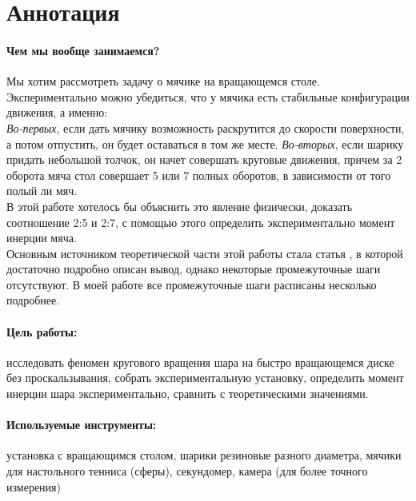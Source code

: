 \documentclass[a4paper,12pt]{article}
\begin{document}
	
	\newpage

	
	\section{Аннотация}
	
	\paragraph{Чем мы вообще занимаемся?}
	
	Мы хотим рассмотреть задачу о мячике на вращающемся столе. Экспериментально можно убедиться, что у мячика есть стабильные конфигурации движения, а именно:\\
	
	\textit{Во-первых}, если дать мячику возможность раскрутится до скорости поверхности, а потом отпустить, он будет оставаться в том же месте.
	\textit{Во-вторых}, если шарику придать небольшой толчок, он начет совершать круговые движения, причем за 2 оборота мяча стол совершает 5 или 7 полных оборотов, в зависимости от того полый ли мяч.\\
	
	В этой работе хотелось бы объяснить это явление физически, доказать соотношение 2:5 и 2:7, с помощью этого определить экспериментально момент инерции мяча.\\
	
	Основным источником теоретической части этой работы стала статья \cite{weltner}, в которой достаточно подробно описан вывод, однако некоторые промежуточные шаги отсутствуют. В моей работе все промежуточные шаги расписаны несколько подробнее.
	
	
	\paragraph{Цель работы:} \hspace{-4mm} 
	исследовать феномен кругового вращения шара на быстро вращающемся диске без проскальзывания, собрать экспериментальную установку, определить момент инерции шара экспериментально, сравнить с теоретическими значениями.
	\paragraph{Используемые инструменты:} \hspace{-4mm} 
	установка с вращающимся столом, шарики резиновые разного диаметра, мячики для настольного тенниса (сферы), секундомер, камера (для более точного измерения)\\
	
\end{document}
